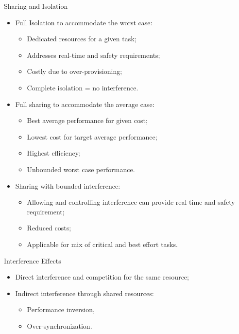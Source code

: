 \begin{frame}{Sharing and Isolation}
  
  \begin{itemize}
  \item Full Isolation to accommodate the worst case:
    \begin{itemize}
    \item Dedicated resources for a given task;
    \item Addresses real-time and safety requirements;
    \item Costly due to over-provisioning;
    \item Complete isolation = no interference.
    \end{itemize}
  \item Full sharing to accommodate the average case:
    \begin{itemize}
    \item Best average performance for given cost;
    \item Lowest cost for target average performance;
    \item Highest efficiency;
    \item Unbounded worst case performance.
    \end{itemize}
  \item Sharing with bounded interference:
    \begin{itemize}
    \item Allowing and controlling interference can provide real-time
      and safety requirement;
    \item Reduced costs;
    \item Applicable for mix of critical and best effort tasks.
    \end{itemize}
  \end{itemize}

\end{frame}

\begin{frame}{Interference Effects}
    \begin{itemize}
    \item Direct interference and competition for the same resource;
    \item Indirect interference through shared resources:
      
      \begin{itemize}
      \item Performance inversion,
      \item Over-synchronization.
      \end{itemize}
    \end{itemize}
\end{frame}

